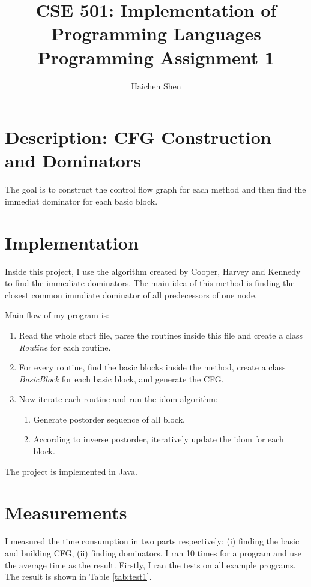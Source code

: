 \documentclass{llncs}
\title{CSE 501: Implementation of Programming Languages\\ Programming Assignment 1}
\author{Haichen Shen}
\institute{}
\begin{document}
\maketitle

\section{Description: CFG Construction and Dominators}
The goal is to construct the control flow graph for each method and then find the immediat dominator for each basic block.

\section{Implementation}
Inside this project, I use the algorithm created by Cooper, Harvey and Kennedy to find the immediate dominators. The main idea of this method is finding the closest common immdiate dominator of all predecessors of one node.

Main flow of my program is:
\begin{enumerate}
	\item Read the whole start file, parse the routines inside this file and create a class {\it Routine} for each routine.
	\item For every routine, find the basic blocks inside the method, create a class {\it BasicBlock} for each basic block, and generate the CFG.
	\item Now iterate each routine and run the idom algorithm:
	\begin{enumerate}[3a.]
		\item Generate postorder sequence of all block.
		\item According to inverse postorder, iteratively update the idom for each block.
	\end{enumerate}
\end{enumerate}

The project is implemented in Java.

\section{Measurements}
I measured the time consumption in two parts respectively: (i) finding the basic and building CFG, (ii) finding dominators. I ran 10 times for a program and use the average time as the result. Firstly, I ran the tests on all example programs. The result is shown in Table \ref{tab:test1}.
\end{document}
